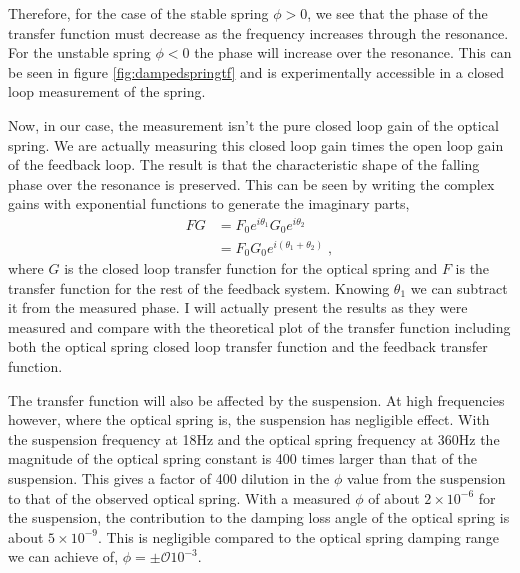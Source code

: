 Therefore, for the case of the stable spring $\phi>0$, we see that the phase of
the transfer function must decrease as the frequency increases through the
resonance.
For the unstable spring $\phi<0$ the phase will increase over the resonance.
This can be seen in figure \ref{fig:dampedspringtf} and is experimentally
accessible in a closed loop measurement of the spring.

Now, in our case, the measurement isn't the pure closed loop gain of the
optical spring.
We are actually measuring this closed loop gain times the open loop gain of the
feedback loop.
The result is that the characteristic shape of the falling phase over the
resonance is preserved.
This can be seen by writing the complex gains with exponential functions to
generate the imaginary parts,
\begin{align}
FG &= F_0e^{i\theta_1}G_0e^{i\theta_2} \nonumber \\
  &= F_0G_0e^{i(\theta_1+\theta_2)} \;,
\end{align}
where $G$ is the closed loop transfer function for the optical spring and
$F$ is the transfer function for the rest of the feedback system.
Knowing $\theta_1$ we can subtract it from the measured phase.
I will actually present the results as they were measured and compare with the
theoretical plot of the transfer function including both the optical spring
closed loop transfer function and the feedback transfer function.

The transfer function will also be affected by the suspension.
At high frequencies however, where the optical spring is, the 
suspension has negligible effect.
With the suspension frequency at 18Hz and the optical spring frequency
at 360Hz the magnitude of the optical spring constant is 400 times larger
than that of the suspension.
This gives a factor of 400 dilution in the $\phi$ value from the suspension
to that of the observed optical spring.
With a measured $\phi$ of about $2\times 10^{-6}$ for the suspension,
the contribution to the damping loss angle of the optical spring is
about $5\times 10^{-9}$.
This is negligible compared to the optical spring damping range we can achieve
of, $\phi = \pm \mathcal{O} 10^{-3}$.


